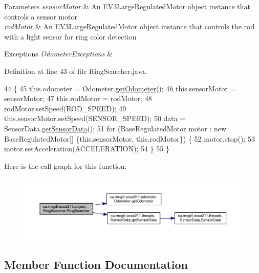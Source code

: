 \begin{DoxyParams}{Parameters}
{\em sensor\+Motor} & An E\+V3\+Large\+Regulated\+Motor object instance that controls a sensor motor \\
\hline
{\em rod\+Motor} & An E\+V3\+Large\+Regulated\+Motor object instance that controls the rod with a light sensor for ring color detection \\
\hline
\end{DoxyParams}

\begin{DoxyExceptions}{Exceptions}
{\em Odometer\+Exceptions} & \\
\hline
\end{DoxyExceptions}


Definition at line 43 of file Ring\+Searcher.\+java.


\begin{DoxyCode}
44                                 \{
45     this.odometer = Odometer.\hyperlink{classca_1_1mcgill_1_1ecse211_1_1odometer_1_1_odometer_a99171f11e34dea918fa9dd069d721439}{getOdometer}();
46     this.sensorMotor = sensorMotor;
47     this.rodMotor = rodMotor;
48     rodMotor.setSpeed(ROD\_SPEED);
49     this.sensorMotor.setSpeed(SENSOR\_SPEED);
50     data = SensorData.\hyperlink{classca_1_1mcgill_1_1ecse211_1_1threads_1_1_sensor_data_a8260aba53b4474ca1275e4ce26157977}{getSensorData}();
51     \textcolor{keywordflow}{for} (BaseRegulatedMotor motor : \textcolor{keyword}{new} BaseRegulatedMotor[] \{this.sensorMotor, this.rodMotor\}) \{
52       motor.stop();
53       motor.setAcceleration(ACCELERATION);
54     \}
55   \}
\end{DoxyCode}
Here is the call graph for this function\+:\nopagebreak
\begin{figure}[H]
\begin{center}
\leavevmode
\includegraphics[width=350pt]{classca_1_1mcgill_1_1ecse211_1_1project_1_1_ring_searcher_a37eebb6cbdfd692e0979c3ca0fe2597b_cgraph}
\end{center}
\end{figure}


\subsection{Member Function Documentation}
\mbox{\label{classca_1_1mcgill_1_1ecse211_1_1project_1_1_ring_searcher_a997bf874ae5577c48719254677830fb7}} 
